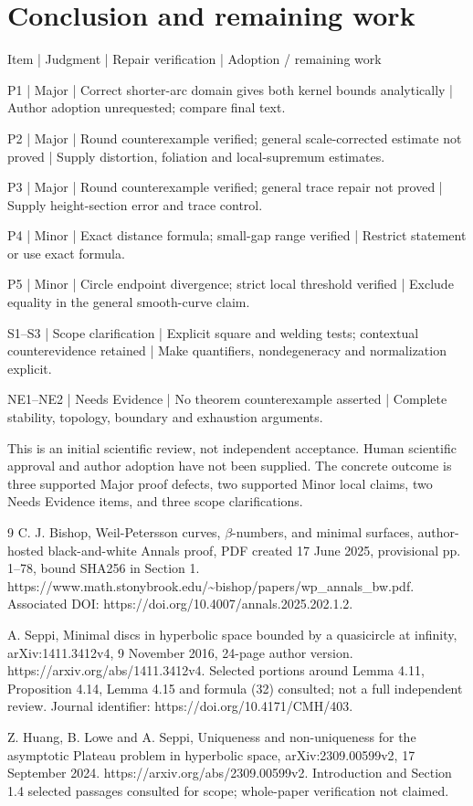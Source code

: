 \documentclass[10pt]{article}
\begin{document}
\section*{Conclusion and remaining work}
Item | Judgment | Repair verification | Adoption / remaining work\par
P1 | Major | Correct shorter-arc domain gives both kernel bounds analytically | Author adoption unrequested; compare final text.\par
P2 | Major | Round counterexample verified; general scale-corrected estimate not proved | Supply distortion, foliation and local-supremum estimates.\par
P3 | Major | Round counterexample verified; general trace repair not proved | Supply height-section error and trace control.\par
P4 | Minor | Exact distance formula; small-gap range verified | Restrict statement or use exact formula.\par
P5 | Minor | Circle endpoint divergence; strict local threshold verified | Exclude equality in the general smooth-curve claim.\par
S1–S3 | Scope clarification | Explicit square and welding tests; contextual counterevidence retained | Make quantifiers, nondegeneracy and normalization explicit.\par
NE1–NE2 | Needs Evidence | No theorem counterexample asserted | Complete stability, topology, boundary and exhaustion arguments.\par
This is an initial scientific review, not independent acceptance. Human scientific approval and author adoption have not been supplied. The concrete outcome is three supported Major proof defects, two supported Minor local claims, two Needs Evidence items, and three scope clarifications.\par
9 C. J. Bishop, Weil-Petersson curves, \(\beta\)-numbers, and minimal surfaces, author-hosted black-and-white Annals proof, PDF created 17 June 2025, provisional pp. 1–78, bound SHA256 in Section 1. https://www.math.stonybrook.edu/\textasciitilde{}bishop/papers/wp\_annals\_bw.pdf. Associated DOI: https://doi.org/10.4007/annals.2025.202.1.2.\par
A. Seppi, Minimal discs in hyperbolic space bounded by a quasicircle at infinity, arXiv:1411.3412v4, 9 November 2016, 24-page author version. https://arxiv.org/abs/1411.3412v4. Selected portions around Lemma 4.11, Proposition 4.14, Lemma 4.15 and formula (32) consulted; not a full independent review. Journal identifier: https://doi.org/10.4171/CMH/403.\par
Z. Huang, B. Lowe and A. Seppi, Uniqueness and non-uniqueness for the asymptotic Plateau problem in hyperbolic space, arXiv:2309.00599v2, 17 September 2024. https://arxiv.org/abs/2309.00599v2. Introduction and Section 1.4 selected passages consulted for scope; whole-paper verification not claimed.\par
\end{document}
